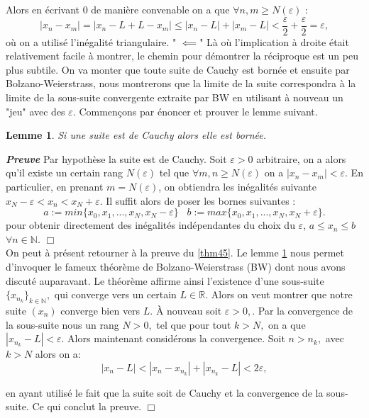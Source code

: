 \documentclass[a4paper, 12pt, french, twoside]{article}
\newtheorem{lemma}[theorem]{Lemme}
\newcommand{\Nn}{{\mathbb{N}}}
\newcommand{\Rr}{{\mathbb{R}}}
\begin{document}
    Alors en écrivant 0 de manière convenable on a que $\forall n,m \ge N(\varepsilon)$ :
    $$ |x_n - x_m| = | x_n -L + L -x_m| \le |x_n - L | + | x_m -L | < \frac{\varepsilon}{2} + \frac{\varepsilon}{2} = \varepsilon,$$
    où on a utilisé l'inégalité triangulaire. \newline 
" $\impliedby$" Là où l'implication à droite était relativement facile à montrer, le chemin pour démontrer la réciproque est un peu plus subtile. On va monter que toute suite de Cauchy est bornée et ensuite par Bolzano-Weierstrass, nous montrerons que la limite de la suite correspondra à la limite de la sous-suite convergente extraite par BW en utilisant à nouveau un "jeu" avec des $\varepsilon$. Commençons par énoncer et prouver le lemme suivant. 
\begin{lemma}\label{lem46}
    Si une suite est de Cauchy alors elle est bornée. 
\end{lemma}  
\textit{\textbf{Preuve}} Par hypothèse la suite est de Cauchy. Soit $\varepsilon >0 $ arbitraire, on a alors qu'il existe un certain rang $N(\varepsilon)$ tel que $\forall m,n \ge N(\varepsilon)$ on a $|x_n-x_m| < \varepsilon$. En particulier, en prenant $m = N(\varepsilon)$, on obtiendra les inégalités suivante $x_N - \varepsilon < x_n < x_N + \varepsilon$. Il suffit alors de poser les bornes suivantes : 
$$ a := min \{x_0, x_1, ..., x_N, x_N - \varepsilon \} \;\;\; b := max \{x_0, x_1, ..., x_N, x_N + \varepsilon \}. $$
pour obtenir directement des inégalités indépendantes du choix du $\varepsilon$, $a \le x_n \le b $ $ \forall n \in \Nn$. $\Box$ \\ \newline
On peut à présent retourner à la preuve du \ref{thm45}. Le lemme \ref{lem46} nous permet d'invoquer le fameux théorème de Bolzano-Weierstrass (BW) dont nous avons discuté auparavant. 
Le théorème affirme ainsi l'existence d'une sous-suite $\{x_{n_k}\}_{k\in\Nn},$ qui converge vers un certain $L\in \Rr.$ Alors on veut montrer que notre suite $(x_n)$ converge bien vers $L.$
À nouveau soit $\varepsilon > 0,$. Par la convergence de la sous-suite nous un rang $N > 0,$ tel que pour tout $k > N,$ on a que $|x_{n_k} - L| < \varepsilon.$ Alors maintenant considérons la convergence. Soit $n > n_k,$ avec $k > N$ alors on a:
\[
|x_n - L| < |x_n - x_{n_k}| + |x_{n_k} - L| < 2\varepsilon,
\]

en ayant utilisé le fait que la suite soit de Cauchy et la convergence de la sous-suite. Ce qui conclut la preuve. $\Box$   
\newline 
\newline 
\end{document}
